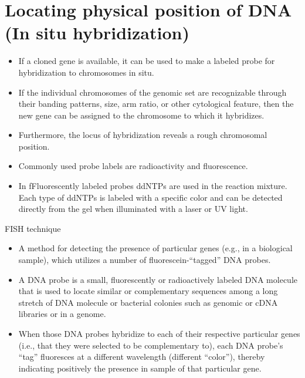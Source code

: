 \documentclass[11pt,dvipsnames,ignorenonframetext,aspectratio=169]{beamer}
\providecommand{\tightlist}{%
  \setlength{\itemsep}{0pt}\setlength{\parskip}{0pt}}
\begin{document}
\hypertarget{locating-physical-position-of-dna-in-situ-hybridization}{%
\section{Locating physical position of DNA (In situ
hybridization)}\label{locating-physical-position-of-dna-in-situ-hybridization}}

\begin{frame}{}
\protect\hypertarget{section-2}{}
\begin{itemize}
\tightlist
\item
  If a cloned gene is available, it can be used to make a labeled probe
  for hybridization to chromosomes in situ.
\item
  If the individual chromosomes of the genomic set are recognizable
  through their banding patterns, size, arm ratio, or other cytological
  feature, then the new gene can be assigned to the chromosome to which
  it hybridizes.
\item
  Furthermore, the locus of hybridization reveals a rough chromosomal
  position.
\item
  Commonly used probe labels are radioactivity and fluorescence.
\item
  In fFluorescently labeled probes ddNTPs are used in the reaction
  mixture. Each type of ddNTPs is labeled with a specific color and can
  be detected directly from the gel when illuminated with a laser or UV
  light.
\end{itemize}
\end{frame}

\begin{frame}{FISH technique}
\protect\hypertarget{fish-technique}{}
\begin{itemize}
\tightlist
\item
  A method for detecting the presence of particular genes (e.g., in a
  biological sample), which utilizes a number of fluorescein-``tagged''
  DNA probes.
\item
  A DNA probe is a small, fluorescently or radioactively labeled DNA
  molecule that is used to locate similar or complementary sequences
  among a long stretch of DNA molecule or bacterial colonies such as
  genomic or cDNA libraries or in a genome.
\item
  When those DNA probes hybridize to each of their respective particular
  genes (i.e., that they were selected to be complementary to), each DNA
  probe's ``tag'' fluoresces at a different wavelength (different
  ``color''), thereby indicating positively the presence in sample of
  that particular gene.
\end{itemize}
\end{frame}
\end{document}
